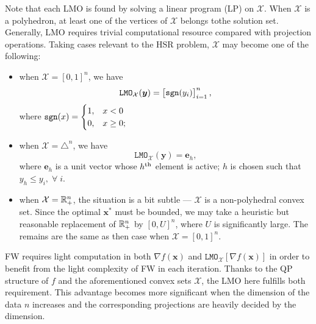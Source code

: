 Note that each LMO is found by solving a linear program (LP) on $\mathcal X$.
When $\mathcal X$ is a polyhedron, at least one of the vertices of
$\mathcal X$ belongs tothe solution set.
Generally, LMO requires trivial computational resource compared with
projection operations.
Taking cases  relevant to the HSR problem, $\mathcal X$ may become one of the
following:
%
\begin{itemize}
    \item when $\mathcal X = [0,1]^n$, we have
        \begin{equation}
            \texttt{LMO}_{\mathcal X}(\bm y) =
            \begin{bmatrix} \texttt{sgn}{(y_i)} \end{bmatrix}_{i=1}^n,
        \end{equation}
        where $\texttt{sgn}{(x)} = \begin{cases} 1, & x < 0 \\ 0, & x \geq 0; \end{cases}$
    \item when $\mathcal X = \triangle^n$, we have
        \begin{equation}
            \texttt{LMO}_{\mathcal X}(\bm y) = \bm e_h,
        \end{equation}
        where $\bm e_h$ is a unit vector whose $h^\text{th}$ element is active;
        $h$ is chosen such that $y_h \leq y_i, \; \forall \; i$.
    \item when $\mathcal X = \mathbb R_+^n$, the situation is a bit subtle ---
          $\mathcal X$ is a non-polyhedral convex set.
          Since the optimal $\bm x^*$ must be bounded, we may take a heuristic
          but reasonable replacement of $\mathbb R_+^n$ by $[0,U]^n$, where $U$ is
          significantly large.
          The remains are the same as then case when $\mathcal X = [0,1]^n$.
\end{itemize}
FW requires light computation in both $\nabla f(\bm x)$ and
$\texttt{LMO}_{\mathcal X} \left[\nabla f (\bm x)\right]$ in order to benefit
from the light complexity of FW in each iteration.
Thanks to the QP structure of $f$ and the aforementioned convex sets
$\mathcal X$, the LMO here fulfills both requirement.
This advantage becomes more significant when the dimension of the data
$n$ increases and the corresponding projections are heavily decided by the
dimension.


